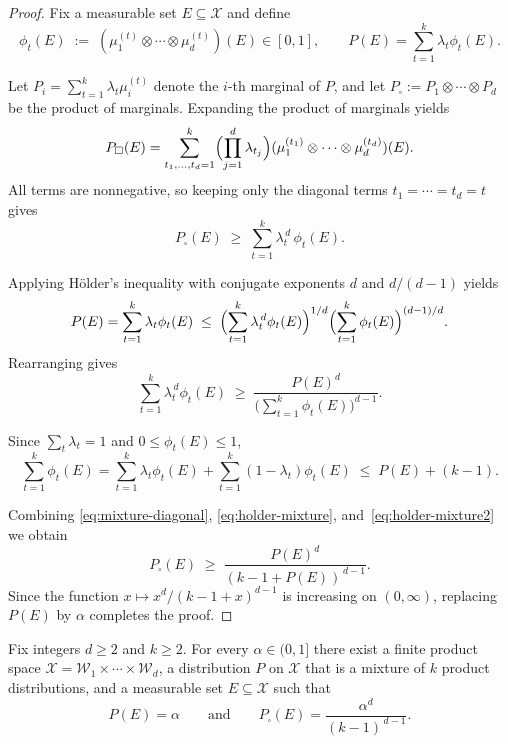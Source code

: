 \documentclass[arxiv]{colt2026}
\newcommand{\X}{\mathcal{X}}
\newcommand{\W}{\mathcal{W}}
\begin{document}
\begin{proof}
Fix a measurable set $E\subseteq\X$ and define
\[
\phi_t(E)
\;:=\;
(\mu^{(t)}_1\otimes\cdots\otimes\mu^{(t)}_d)(E)
\in[0,1],
\qquad
P(E)=\sum_{t=1}^k \lambda_t\phi_t(E).
\]

Let $P_i=\sum_{t=1}^k\lambda_t\mu^{(t)}_i$ denote the $i$-th marginal of $P$, and
let
\(
P_{\square}:=P_1\otimes\cdots\otimes P_d
\)
be the product of marginals.
Expanding the product of marginals yields
\[
P_{\square}(E)
=
\sum_{t_1,\ldots,t_d=1}^k
\Bigl(\prod_{j=1}^d \lambda_{t_j}\Bigr)
(\mu^{(t_1)}_1\otimes\cdots\otimes\mu^{(t_d)}_d)(E).
\]
All terms are nonnegative, so keeping only the diagonal terms
$t_1=\cdots=t_d=t$ gives
\begin{equation}
\label{eq:mixture-diagonal}
P_{\square}(E)
\;\ge\;
\sum_{t=1}^k \lambda_t^{\,d}\,\phi_t(E).
\end{equation}

Applying Hölder’s inequality with conjugate exponents $d$ and $d/(d-1)$ yields
\[
P(E)
=
\sum_{t=1}^k \lambda_t\phi_t(E)
\;\le\;
\Bigl(\sum_{t=1}^k \lambda_t^{\,d}\phi_t(E)\Bigr)^{1/d}
\Bigl(\sum_{t=1}^k \phi_t(E)\Bigr)^{(d-1)/d}.
\]
Rearranging gives
\begin{equation}
\label{eq:holder-mixture}
\sum_{t=1}^k \lambda_t^{\,d}\phi_t(E)
\;\ge\;
\frac{P(E)^d}{\bigl(\sum_{t=1}^k \phi_t(E)\bigr)^{d-1}}.
\end{equation}

Since $\sum_t\lambda_t=1$ and $0\le\phi_t(E)\le 1$,
\begin{equation}
\label{eq:holder-mixture2}
\sum_{t=1}^k \phi_t(E)
=
\sum_{t=1}^k \lambda_t\phi_t(E)
+
\sum_{t=1}^k (1-\lambda_t)\phi_t(E)
\;\le\;
P(E)+(k-1).
\end{equation}

Combining \eqref{eq:mixture-diagonal}, \eqref{eq:holder-mixture}, and~\eqref{eq:holder-mixture2} we obtain
\[
P_{\square}(E)
\;\ge\;
\frac{P(E)^d}{(k-1+P(E))^{\,d-1}}.
\]
Since the function
\(
x\mapsto x^d/(k-1+x)^{d-1}
\)
is increasing on $(0,\infty)$, replacing $P(E)$ by $\alpha$ completes the proof.
\end{proof}




\begin{lemma}
\label{lem:mixture-unavoidable-symmetric}
Fix integers $d\ge 2$ and $k\ge 2$.
For every $\alpha\in(0,1]$ there exist a finite product space
$\X=\W_1\times\cdots\times\W_d$, a distribution $P$ on $\X$ that is a mixture of
$k$ product distributions, and a measurable set $E\subseteq\X$ such that
\[
P(E)=\alpha
\qquad\text{and}\qquad
P_{\square}(E)=\frac{\alpha^d}{(k-1)^{\,d-1}}.
\]
\end{lemma}
\end{document}
